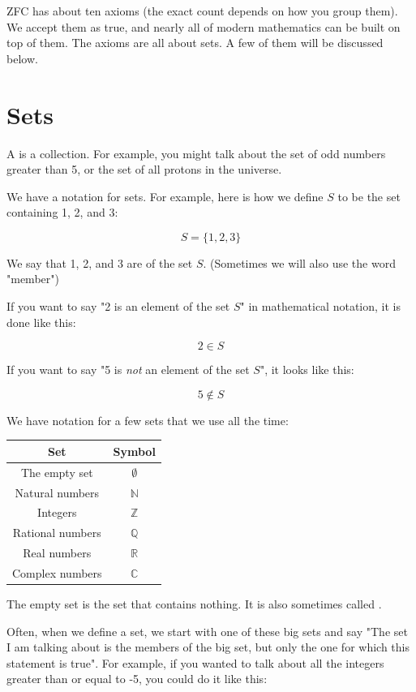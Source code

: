 ZFC has about ten axioms (the exact count depends on how you group them). We accept them as true, and nearly all of modern mathematics can be built on top of them. The axioms are all about sets. A few of them will be discussed below.

\section{Sets}

A  is a collection.  For example, you might talk about the set of
odd numbers greater than 5, or the set of all protons in the
universe.  

We have a notation for sets.  For example, here is how we define $S$ to
be the set containing 1, 2, and 3:

$$S = \{1, 2, 3\}$$

We say that 1, 2, and 3 are  of the set $S$.
(Sometimes we will also use the word "member")

If you want to say "2 is an element of the set $S$" in mathematical
notation, it is done like this:

$$ 2 \in S$$

If you want to say "5 is \textit{not} an element of the set $S$", it
looks like this:

$$ 5 \notin S$$

We have notation for a few sets that we use all the time:

\begin{tabular}{c|c}
Set & Symbol \\
\hline
The empty set & $\emptyset$ \\ \index{$\emptyset$}
Natural numbers & $\mathbb{N}$ \\ \index{$\mathbb{N}$}
Integers & $\mathbb{Z}$ \\ \index{$\mathbb{Z}$}
Rational numbers & $\mathbb{Q}$ \\ \index{$\mathbb{Q}$}
Real numbers & $\mathbb{R}$ \\ \index{$\mathbb{R}$}
Complex numbers & $\mathbb{C}$ \index{$\mathbb{C}$}
\end{tabular}

The empty set is the set that contains nothing.  It is also sometimes
called .

Often, when we define a set, we start with one of these big sets and
say "The set I am talking about is the members of the big set, but only
the one for which this statement is true".  For example, if you wanted
to talk about all the integers greater than or equal to -5, you could
do it like this:

